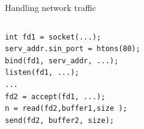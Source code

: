 \documentclass{beamer}
\begin{document}
\begin{frame}[fragile]{Handling network traffic}
\begin{columns}
\begin{column}[t]{0.5\textwidth}
\begin{verbatim}
int fd1 = socket(...);
serv_addr.sin_port = htons(80);
bind(fd1, serv_addr, ...);
listen(fd1, ...);
...
fd2 = accept(fd1, ...);
n = read(fd2,buffer1,size );
send(fd2, buffer2, size);
\end{verbatim}
\end{column}
\begin{column}[t]{0.5\textwidth}  %
    \begin{center}
\end{center}
\end{column}
\end{columns}
\end{frame}
\end{document}
